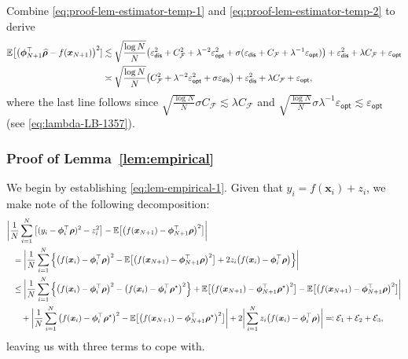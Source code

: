 \documentclass[english]{article}
\begin{document}
Combine \eqref{eq:proof-lem-estimator-temp-1} and \eqref{eq:proof-lem-estimator-temp-2} to derive
%
\begin{align*}
\mathbb{E}\big[\big({\bm \phi}_{N+1}^{\top}\widehat{\bm \rho}-f({\bm x}_{N+1})\big)^2]
&\lesssim \sqrt{\frac{\log N}{N}}\big(\varepsilon_{\mathsf{dis}}^2 + C_{\mathcal{F}}^2 + \lambda^{-2}\varepsilon_{\mathsf{opt}}^2 + \sigma(\varepsilon_{\mathsf{dis}} + C_{\mathcal{F}} + \lambda^{-1}\varepsilon_{\mathsf{opt}})\big) + \varepsilon_{\mathsf{dis}}^2 + \lambda C_{\mathcal{F}} + \varepsilon_{\mathsf{opt}}\notag\\
&\asymp \sqrt{\frac{\log N}{N}}\big(C_{\mathcal{F}}^2 + \lambda^{-2}\varepsilon_{\mathsf{opt}}^2 + \sigma\varepsilon_{\mathsf{dis}}\big) + \varepsilon_{\mathsf{dis}}^2 + \lambda C_{\mathcal{F}} + \varepsilon_{\mathsf{opt}},
\end{align*}
%
where the last line follows since  $\sqrt{\frac{\log N}{N}}\sigma C_{\mathcal{F}}\lesssim \lambda C_{\mathcal{F}}$ and $\sqrt{\frac{\log N}{N}}\sigma\lambda^{-1}\varepsilon_{\mathsf{opt}}\lesssim \varepsilon_{\mathsf{opt}}$ (see \eqref{eq:lambda-LB-1357}).



\subsubsection{Proof of Lemma~\ref{lem:empirical}}
\label{sec:proof:lem:empirical}

We begin by establishing  \eqref{eq:lem-empirical-1}.
Given that $y_i=f(\bm{x}_i)+z_i$, 
we make note of the following decomposition: 
%
\begin{align}
& \bigg|\frac{1}{N}\sum_{i = 1}^N \big[(y_i - {\bm \phi}_i^{\top}{\bm \rho})^2 - z_i^2\big] - \mathbb{E}\big[\big(f({\bm x}_{N+1}) - {\bm \phi}_{N+1}^{\top}{\bm \rho}\big)^2\big]\bigg| \notag\\
&~~ = \bigg|\frac{1}{N}\sum_{i = 1}^N \Big\{\big(f({\bm x}_i) - {\bm \phi}_i^{\top}{\bm \rho}\big)^2 - \mathbb{E}\big[\big(f({\bm x}_{N+1}) - {\bm \phi}_{N+1}^{\top}{\bm \rho}\big)^2\big] + 2z_i\big(f({\bm x}_i) - {\bm \phi}_i^{\top}{\bm \rho}\big)\Big\}\bigg|\notag\\
&~~ \le \bigg|\frac{1}{N}\sum_{i = 1}^N \Big\{\big(f({\bm x}_i) - {\bm \phi}_i^{\top}{\bm \rho}\big)^2 - \big(f({\bm x}_i) - {\bm \phi}_i^{\top}{\bm \rho}^{\star}\big)^2\Big\}+\mathbb{E}\big[\big(f({\bm x}_{N+1}) - {\bm \phi}_{N+1}^{\top}{\bm \rho}^{\star}\big)^2\big]-\mathbb{E}\big[\big(f({\bm x}_{N+1}) - {\bm \phi}_{N+1}^{\top}{\bm \rho}\big)^2\big]\bigg|\notag\\
&~~\quad + \bigg|\frac{1}{N}\sum_{i = 1}^N \big(f({\bm x}_i) - {\bm \phi}_i^{\top}{\bm \rho}^{\star}\big)^2-
\mathbb{E}\big[\big(f({\bm x}_{N+1}) - {\bm \phi}_{N+1}^{\top}{\bm \rho}^{\star}\big)^2\big]\bigg|
+ 2\bigg|\sum_{i=1}^Nz_i\big(f({\bm x}_i) - {\bm \phi}_i^{\top}{\bm \rho}\big)\bigg|\eqqcolon \mathcal{E}_1 + \mathcal{E}_2 + \mathcal{E}_3,
\label{eq:proof-lem-empirical-1-decomp}
\end{align}
%
leaving us with three terms to cope with. 
\end{document}
